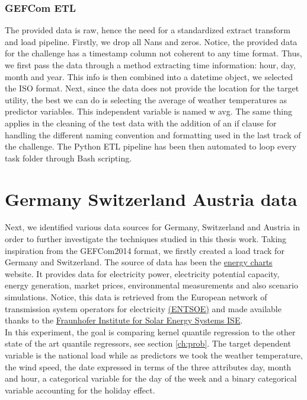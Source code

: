 \subsubsection{GEFCom ETL}
The provided data is raw, hence the need for a standardized extract transform and load pipeline. 
Firstly, we drop all Nans and zeros. Notice, the provided data for the challenge has a timestamp column not coherent to any time format. Thus, we first pass the data through a method extracting time information: hour, day, month and year. This info is then combined into a datetime object, we selected the ISO format.
Next, since the data does not provide the location for the target utility, the best we can do is selecting the average of weather temperatures as predictor variables. This independent variable is named w avg.
The same thing applies in the cleaning of the test data with the addition of an if clause for handling the different naming convention and formatting used in the last track of the challenge. The Python ETL pipeline has been then automated to loop every task folder through Bash scripting.


\section{Germany Switzerland Austria data}
Next, we identified various data sources for Germany, Switzerland and Austria in order to further
investigate the techniques studied in this thesis work.
Taking inspiration from the GEFCom2014 format, we firstly created a load track for Germany and Switzerland. 
The source of data has been the \href{https://www.energy-charts.info/index.html?l=en&c=DE}{energy charts} website. It provides data for electricity power, electricity potential capacity, energy generation, market prices, environmental measurements and also scenario simulations. Notice, this data is retrieved from the European network of transmission system operators for electricity \href{https://www.entsoe.eu/}{(ENTSOE)} and made available thanks to the \href{https://ise.fraunhofer.de/en.html}{Fraunhofer Institute for Solar Energy Systems ISE}.
\\
In this experiment, the goal is comparing kernel quantile regression to the other state of the art quantile regressors, see section \ref{ch:prob}.
The target dependent variable is the national load while as predictors we took
the weather temperature, the wind speed, the date expressed in terms of the three attributes day, month and hour, a categorical variable for the day of the week and a binary categorical variable accounting for the holiday effect.


